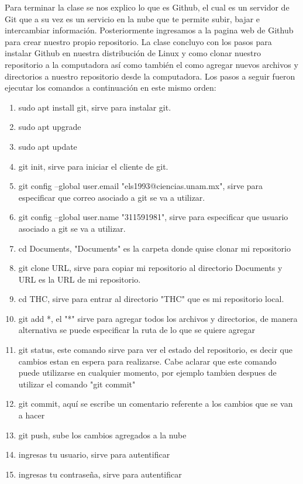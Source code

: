 \documentclass[letterpaper, 12pt, oneside]{article}
\begin{document}
	Para terminar la clase se nos explico lo que es Github, el cual es un servidor de Git que a su vez es un servicio en la nube que te permite subir, bajar e intercambiar información. Posteriormente ingresamos a la pagina web de Github para crear nuestro propio repositorio. La clase concluyo con los pasos para instalar Github en nuestra distribución de Linux y como clonar nuestro repositorio a la computadora así como también el como agregar nuevos archivos y directorios a nuestro repositorio desde la computadora. Los pasos a seguir fueron ejecutar los comandos a continuación en este mismo orden:
	\begin{enumerate}
		\item sudo apt install git, sirve para instalar git.
		\item sudo apt upgrade
		\item sudo apt update
		\item git init, sirve para iniciar el cliente de git.
		\item git config --global user.email "els1993@ciencias.unam.mx", sirve para especificar que correo asociado a git se va a utilizar.
		\item git config --global user.name "311591981", sirve para especificar que usuario asociado a git se va a utilizar.
		\item cd Documents, "Documents" es la carpeta donde quise clonar mi repositorio
		\item git clone URL, sirve para copiar mi repositorio al directorio Documents y URL es la URL de mi repositorio.
		\item cd THC, sirve para entrar al directorio "THC" que es mi repositorio local.
		\item git add *, el "*" sirve para agregar todos los archivos y directorios, de manera alternativa se puede especificar la ruta de lo que se quiere agregar
		\item git status, este comando sirve para ver el estado del repositorio, es decir que cambios estan en espera para realizarse. Cabe aclarar que este comando puede utilizarse en cualquier momento, por ejemplo tambien despues de utilizar el comando "git commit"
		\item git commit, aquí se escribe un comentario referente a los cambios que se van a hacer
		\item git push, sube los cambios agregados a la nube
		\item ingresas tu usuario, sirve para autentificar 
		\item ingresas tu contraseña, sirve para autentificar	
	\end{enumerate}
\end{document}
